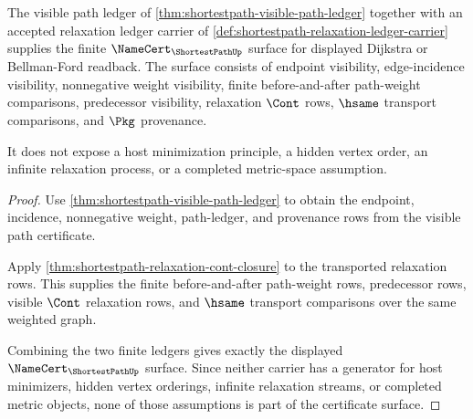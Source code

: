 \begin{theorem}
\label{thm:shortestpath-visible-relaxation-namecert-surface}
The visible path ledger of
\autoref{thm:shortestpath-visible-path-ledger} together with an accepted
relaxation ledger carrier of
\autoref{def:shortestpath-relaxation-ledger-carrier} supplies the finite
$\NameCert_{\ShortestPathUp}$ surface for displayed Dijkstra or Bellman-Ford
readback. The surface consists of endpoint visibility, edge-incidence
visibility, nonnegative weight visibility, finite before-and-after
path-weight comparisons, predecessor visibility, relaxation $\Cont$ rows,
$\hsame$ transport comparisons, and $\Pkg$ provenance.

It does not expose a host minimization principle, a hidden vertex order, an
infinite relaxation process, or a completed metric-space assumption.
\end{theorem}
\begin{proof}
Use \autoref{thm:shortestpath-visible-path-ledger} to obtain the endpoint,
incidence, nonnegative weight, path-ledger, and provenance rows from the
visible path certificate.

Apply \autoref{thm:shortestpath-relaxation-cont-closure} to the transported
relaxation rows. This supplies the finite before-and-after path-weight rows,
predecessor rows, visible $\Cont$ relaxation rows, and $\hsame$ transport
comparisons over the same weighted graph.

Combining the two finite ledgers gives exactly the displayed
$\NameCert_{\ShortestPathUp}$ surface. Since neither carrier has a generator
for host minimizers, hidden vertex orderings, infinite relaxation streams, or
completed metric objects, none of those assumptions is part of the certificate
surface.
\end{proof}

